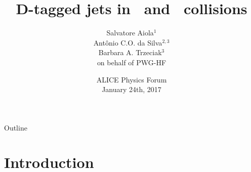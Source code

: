 \documentclass[xcolor={usenames,dvipsnames}]{beamer}
\title[D-tagged jets in \pp\ and \pPb\ collisions] %
{D-tagged jets in \pp\ and \pPb\ collisions}
\author[Salvatore Aiola]%
{Salvatore Aiola$^{1}$ \\
Ant\^onio C.O. da Silva$^{2,3}$ \\
Barbara A. Trzeciak$^{3}$ \\ 
\bigskip
on behalf of PWG-HF}
\institute[Yale University] %
{$^{1}$Yale University\\
$^{2}$University of S\~ao Paulo \\
$^{3}$Utrecht University}
\date[PF - Jan. 24th, 2017] %
{ALICE Physics Forum \\
January 24th, 2017}
\begin{document}
\begin{frame}
  \titlepage
\end{frame}

\begin{frame}{Outline}
    \tableofcontents
 \end{frame}





\section{Introduction}
\end{document}
